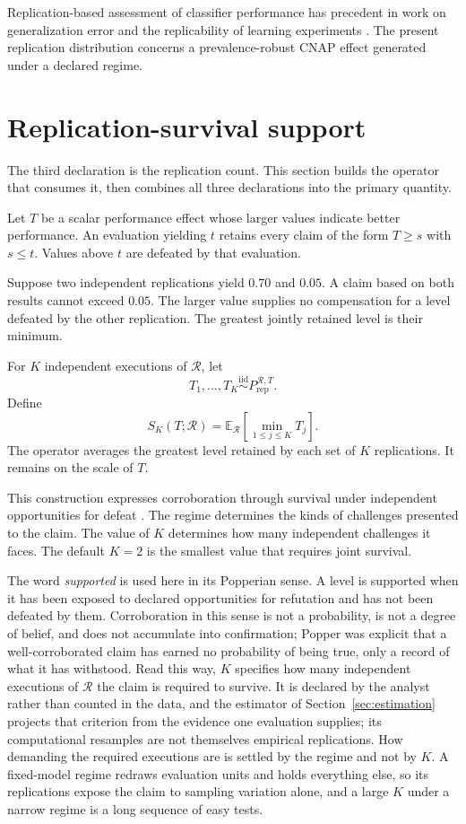 \documentclass[11pt]{article}
\newcommand{\Regime}{\mathcal{R}}
\newcommand{\E}{\mathbb{E}}
\newcommand{\iid}{\mathrel{\overset{\mathrm{iid}}{\sim}}}
\theoremstyle{remark}
\begin{document}
Replication-based assessment of classifier performance has precedent in work on generalization error and the replicability of learning experiments \cite{nadeau2003inference,bouckaert2004estimating}. The present replication distribution concerns a prevalence-robust CNAP effect generated under a declared regime.

\section{Replication-survival support}
\label{sec:support}

The third declaration is the replication count. This section builds the operator that consumes it, then combines all three declarations into the primary quantity.

Let $T$ be a scalar performance effect whose larger values indicate better performance. An evaluation yielding $t$ retains every claim of the form $T\geq s$ with $s\leq t$. Values above $t$ are defeated by that evaluation.

Suppose two independent replications yield $0.70$ and $0.05$. A claim based on both results cannot exceed $0.05$. The larger value supplies no compensation for a level defeated by the other replication. The greatest jointly retained level is their minimum.

For $K$ independent executions of $\Regime$, let
\[
T_1,\ldots,T_K
\iid
P_{\mathrm{rep}}^{\Regime,T}.
\]
Define
\begin{equation}
S_K(T;\Regime)
=
\E_{\Regime}
\left[
\min_{1\leq j\leq K}T_j
\right].
\label{eq:support-operator}
\end{equation}
The operator averages the greatest level retained by each set of $K$ replications. It remains on the scale of $T$.

This construction expresses corroboration through survival under independent opportunities for defeat \cite{popper1959logic}. The regime determines the kinds of challenges presented to the claim. The value of $K$ determines how many independent challenges it faces. The default $K=2$ is the smallest value that requires joint survival.

The word \emph{supported} is used here in its Popperian sense. A level is supported when it has been exposed to declared opportunities for refutation and has not been defeated by them. Corroboration in this sense is not a probability, is not a degree of belief, and does not accumulate into confirmation; Popper was explicit that a well-corroborated claim has earned no probability of being true, only a record of what it has withstood. Read this way, $K$ specifies how many independent executions of $\Regime$ the claim is required to survive. It is declared by the analyst rather than counted in the data, and the estimator of Section~\ref{sec:estimation} projects that criterion from the evidence one evaluation supplies; its computational resamples are not themselves empirical replications. How demanding the required executions are is settled by the regime and not by $K$. A fixed-model regime redraws evaluation units and holds everything else, so its replications expose the claim to sampling variation alone, and a large $K$ under a narrow regime is a long sequence of easy tests.
\end{document}
